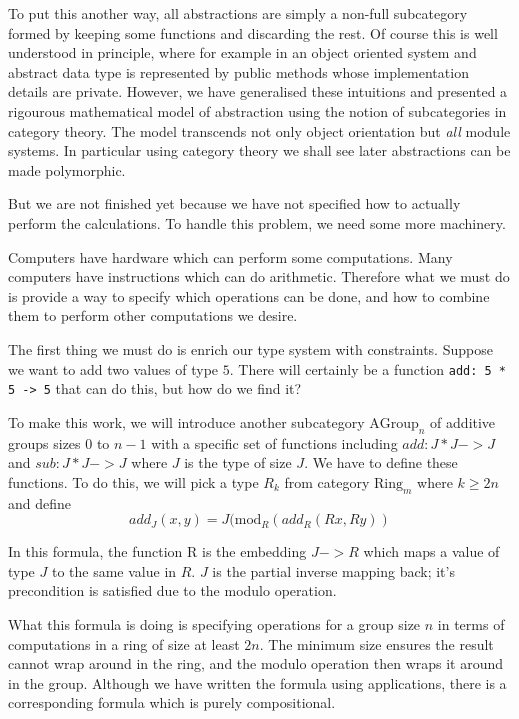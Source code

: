 To put this another way, all abstractions are simply a non-full subcategory
formed by keeping some functions and discarding the rest. Of course
this is well understood in principle, where for example in an object
oriented system and abstract data type is represented by public methods
whose implementation details are private. However, we have generalised
these intuitions and presented a rigourous mathematical model of abstraction
using the notion of subcategories in category theory. The model transcends
not only object orientation but {\em all} module systems. In particular
using category theory we shall see later abstractions can be made polymorphic.



But we are not finished yet because we have not specified how to actually
perform the calculations. To handle this problem, we need some more
machinery.

Computers have hardware which can perform some computations. Many computers
have instructions which can do arithmetic. Therefore what we must do is
provide a way to specify which operations can be done, and how to
combine them to perform other computations we desire.

The first thing we must do is enrich our type system with constraints.
Suppose we want to add two values of type $5$. There will certainly
be a function \verb$add: 5 * 5 -> 5$ that can do this, but how do we find it?

To make this work, we will introduce another subcategory $\mathrm{AGroup}_n$ of
additive groups sizes 0 to $n-1$ with a specific set of functions including 
$add: J * J -> J$ and $sub: J * J -> J$ where $J$ is the type of size $J$.
We have to define these functions. To do this, we will pick a type $R_k$ from category
$\mathrm{Ring}_m$ where $k\ge 2n$ and define 
$$add_J (x,y) = J(\mathrm{mod}_R (add_R(R x, R y))$$ 

In this formula, the function R is the embedding $J->R$ which maps a value of type $J$ to
the same value in $R$. $J$ is the partial inverse mapping back; it's precondition is satisfied
due to the modulo operation. 

What this formula is doing is specifying operations for a group size $n$ in terms of computations
in a ring of size at least $2n$. The minimum size ensures the result cannot wrap around
in the ring, and the modulo operation then wraps it around in the group. Although we have
written the formula using applications, there is a corresponding formula which is purely
compositional.

